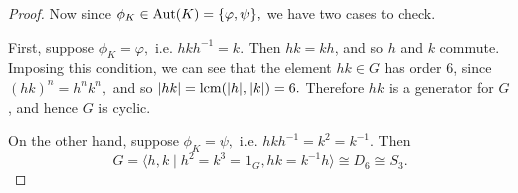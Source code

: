 \begin{proof}
  Now since $\phi_K \in \operatorname{Aut}(K) = \{\varphi, \psi\},$ we have two cases to check.

  First, suppose $\phi_K = \varphi,$ i.e. $hkh^{-1} = k$. Then $hk = kh$, and so $h$ and $k$ commute.
  Imposing this condition, we can see that the element $hk \in G$ has order 6, since $(hk)^n = h^nk^n,$ and so $|hk| = \operatorname*{lcm}(|h|,|k|) = 6.$
  Therefore $hk$ is a generator for $G$, and hence $G$ is cyclic.


  On the other hand, suppose $\phi_K = \psi,$ i.e. $hkh^{-1} = k^2 = k^{-1}.$
  Then $$G = \langle h, k \mid h^2 = k^3 = 1_G, hk = k^{-1}h \rangle \cong D_6 \cong S_3.$$

  
  

  
  

\end{proof}

